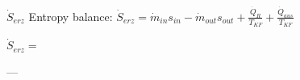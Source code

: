 \( \dot{S}_{erz} \)  
Entropy balance:  
\( \dot{S}_{erz} = \dot{m}_{in} s_{in} - \dot{m}_{out} s_{out} + \frac{\dot{Q}_R}{T_{KF}} + \frac{\dot{Q}_{aus}}{T_{KF}} \)  

\( \dot{S}_{erz} = \)  

---